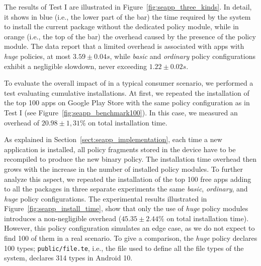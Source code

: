 The results of Test I are illustrated in
Figure~\ref{fig:seapp_three_kinds}.  In detail, it shows in blue
(i.e., the lower part of the bar) the time required by the system to
install the current package without the dedicated policy module, while
in orange (i.e., the top of the bar) the overhead caused by the
presence of the policy module.  The data report that a limited
overhead is associated with apps with \textit{huge} policies, at most
$3.59 \pm 0.04 s$, while \textit{basic} and \textit{ordinary} policy
configurations exhibit a negligible slowdown, never exceeding
$1.22 \pm 0.02 s$.

To evaluate the overall impact of \seapp in a typical consumer scenario,
we performed a test evaluating cumulative installations.  At first, we
repeated the installation of the top 100 apps on Google Play Store
with the same policy configuration as in Test I (see
Figure~\ref{fig:seapp_benchmark100}).  In this case, we measured an
overhead of $20.98 \pm 1,31\%$ on total installation time.

As explained in Section~\ref{sect:seapp_implementation}, each time a
new application is installed, all policy fragments stored in the
device have to be recompiled to produce the new binary policy.  The
installation time overhead then grows with the increase in the number
of installed policy modules.  To further analyze this aspect, we
repeated the installation of the top 100 free apps adding to all the
packages in three separate experiments the same \textit{basic},
\textit{ordinary}, and \textit{huge} policy configurations.  The
experimental results illustrated in
Figure~\ref{fig:seapp_install_time}, show that only the use of {\em
  huge} policy modules introduces a non-negligible overhead
($45.35 \pm 2.44\%$ on total installation time).  However, this policy
configuration simulates an edge case, as we do not expect to find 100
of them in a real scenario. To give a comparison, the {\em huge}
policy declares 100 types; {\tt public/file.te}, i.e., the file used
to define all the file types of the system, declares 314 types in
Android 10.

